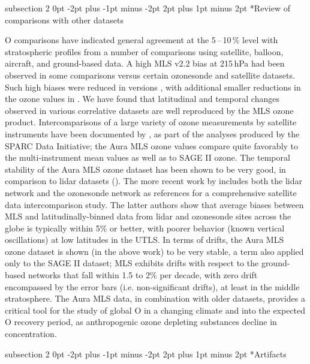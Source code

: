 \documentclass[11pt,draft]{report}
\makeatletter
\renewcommand{\subsection}{\@startsection%
  {subsection}%
  {2}%
  {0pt}%
  {-2pt plus -1pt minus -2pt}%
  {2pt plus 1pt minus 2pt}%
  {\large\sffamily\fontseries{sb}\selectfont\flushleft\color{SectionColor}\figureversion{tabular}}}%
\makeatother
\begin{document}
\subsection*{Review of comparisons with other datasets} 
 
O comparisons have indicated general agreement at the 5\,--\,10\,\%
level with stratospheric profiles from a number of comparisons using
satellite, balloon, aircraft, and ground-based data.  A high MLS v2.2
bias at 215\,hPa had been observed in some comparisons versus certain
ozonesonde and satellite datasets. Such high biases were reduced in
versions \prevv, with additional smaller reductions in the
ozone values in \thisv.  We have found that latitudinal and temporal
changes observed in various correlative datasets are well reproduced by
the MLS ozone product.  Intercomparisons of a large variety of ozone
measurements by satellite instruments have been documented by
\citet{TegtmeierEtal13}, as part of the analyses produced by the SPARC
Data Initiative; the Aura MLS ozone values compare quite favorably to
the multi-instrument mean values as well as to SAGE II ozone.  The temporal stability of the Aura MLS ozone dataset has been shown to be very good, in comparison to lidar datasets (\citet{NairEtal12}). The more recent
work by \citet{HubertEtal16} includes both the lidar network and the ozonesonde network as references for a comprehensive satellite data intercomparison study. The latter authors show that average biases between MLS and latitudinally-binned data from lidar and ozonesonde sites across the globe is typically within 5\% or better, with poorer behavior (known vertical oscillations) at low latitudes in the UTLS.  In terms of drifts, the Aura MLS ozone dataset is shown (in the above work) to be very stable, a term also applied only to the SAGE II dataset; MLS exhibits drifts with respect to the ground-based networks that fall within 1.5 to 2\% per decade, with zero drift encompassed by the error bars (i.e. non-significant drifts), at least in the middle stratosphere. The Aura MLS data, in combination with older datasets, provides a critical tool for the study of global O in a changing climate and into the expected O recovery period, as anthropogenic ozone depleting substances decline in concentration. 

\subsection*{Artifacts} 
\end{document}
